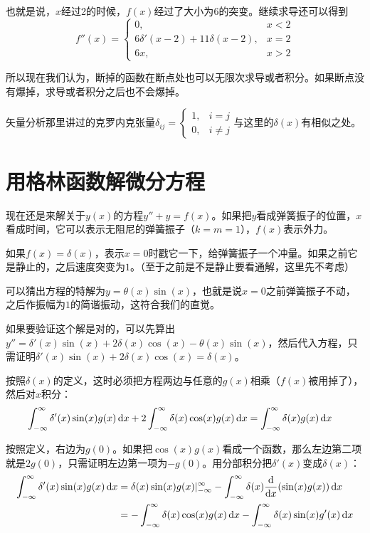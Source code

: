 也就是说，$x$经过2的时候，$f(x)$经过了大小为$6$的突变。继续求导还可以得到
\begin{equation*}
f''(x)=\begin{cases}
0, &x<2 \\
6 \delta'(x-2)+11 \delta(x-2), &x=2 \\
6x, &x>2
\end{cases}
\end{equation*}

所以现在我们认为，断掉的函数在断点处也可以无限次求导或者积分。如果断点没有爆掉，求导或者积分之后也不会爆掉。

矢量分析那里讲过的克罗内克张量$\delta_{i j}=\begin{cases} 1, &i=j \\ 0, &i \neq j \end{cases}$与这里的$\delta(x)$有相似之处。
\section{用格林函数解微分方程}
现在还是来解关于$y(x)$的方程$y''+y=f(x)$。如果把$y$看成弹簧振子的位置，$x$看成时间，它可以表示无阻尼的弹簧振子（$k=m=1$），$f(x)$表示外力。

如果$f(x)=\delta(x)$，表示$x=0$时戳它一下，给弹簧振子一个冲量。如果之前它是静止的，之后速度突变为$1$。（至于之前是不是静止要看通解，这里先不考虑）

可以猜出方程的特解为$y=\theta(x) \sin(x)$，也就是说$x=0$之前弹簧振子不动，之后作振幅为$1$的简谐振动，这符合我们的直觉。

如果要验证这个解是对的，可以先算出$y''=\delta'(x) \sin(x)+2 \delta(x) \cos(x)-\theta(x) \sin(x)$，然后代入方程，只需证明$\delta'(x) \sin(x)+2 \delta(x) \cos(x)=\delta(x)$。

按照$\delta(x)$的定义，这时必须把方程两边与任意的$g(x)$相乘（$f(x)$被用掉了），然后对$x$积分：
\begin{align*}
\int_{-\infty}^{\infty} \delta'(x) \sin(x) g(x) \mathop{}\!\mathrm{d} x+2 \int_{-\infty}^{\infty} \delta(x) \cos(x) g(x) \mathop{}\!\mathrm{d} x&=\int_{-\infty}^{\infty} \delta(x) g(x) \mathop{}\!\mathrm{d} x
\end{align*}

按照定义，右边为$g(0)$。如果把$\cos(x) g(x)$看成一个函数，那么左边第二项就是$2 g(0)$，只需证明左边第一项为$-g(0)$。用分部积分把$\delta'(x)$变成$\delta(x)$：
\begin{align*}
\int_{-\infty}^{\infty} \delta'(x) \sin(x) g(x) \mathop{}\!\mathrm{d} x&=\delta(x) \sin(x) g(x)|_{-\infty}^{\infty}-\int_{-\infty}^{\infty} \delta(x) \frac{\mathop{}\!\mathrm{d}}{\mathop{}\!\mathrm{d} x}(\sin(x) g(x)) \mathop{}\!\mathrm{d} x \\
&=-\int_{-\infty}^{\infty} \delta(x) \cos(x) g(x) \mathop{}\!\mathrm{d} x-\int_{-\infty}^{\infty} \delta(x) \sin(x) g'(x) \mathop{}\!\mathrm{d} x
\end{align*}

